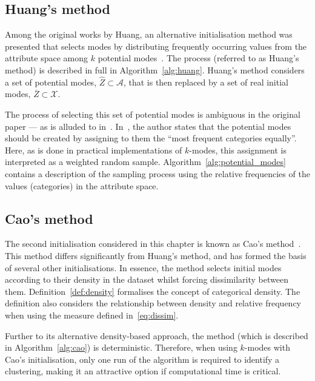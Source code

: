 \subsection{Huang's method}\label{subsec:huang}

Among the original works by Huang, an alternative initialisation method was
presented that selects modes by distributing frequently occurring values from
the attribute space among \(k\) potential modes~\cite{Huang1998}. The process
(referred to as Huang's method) is described in full in
Algorithm~\ref{alg:huang}. Huang's method considers a set of potential modes,
\(\widehat Z \subset \mathcal A\), that is then replaced by a set of real
initial modes, \(\overline Z \subset \mathcal X\).

The process of selecting this set of potential modes is ambiguous in the
original paper --- as is alluded to in~\cite{Jiang2016}. In~\cite{Huang1998},
the author states that the potential modes should be created by assigning to
them the ``most frequent categories equally''. Here, as is done in practical
implementations of \(k\)-modes, this assignment is interpreted as a weighted
random sample. Algorithm~\ref{alg:potential_modes} contains a description of the
sampling process using the relative frequencies of the values (categories) in
the attribute space.



\subsection{Cao's method}\label{subsec:cao}

The second initialisation considered in this chapter is known as Cao's
method~\cite{Cao2009}. This method differs significantly from Huang's method,
and has formed the basis of several other initialisations. In essence, the
method selects initial modes according to their density in the dataset whilst
forcing dissimilarity between them. Definition~\ref{def:density} formalises the
concept of categorical density. The definition also considers the relationship
between density and relative frequency when using the measure defined
in~\eqref{eq:dissim}.

Further to its alternative density-based approach, the method (which is
described in Algorithm~\ref{alg:cao}) is deterministic. Therefore, when using
\(k\)-modes with Cao's initialisation, only one run of the algorithm is required
to identify a clustering, making it an attractive option if computational time
is critical.

